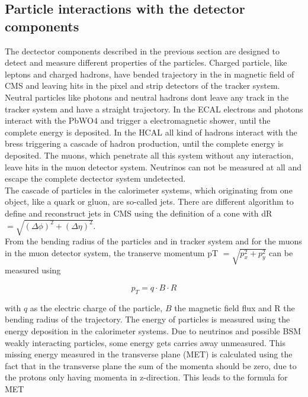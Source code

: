 \subsection{Particle interactions with the detector components}
\label{sec:section_2_2_3}

The dectector components described in the previous section are designed to detect and measure different properties of the particles. Charged particle, like leptons and charged hadrons, have bended trajectory in the in magnetic field of \gls{CMS} and leaving hits in the pixel and strip detectors of the tracker system. Neutral particles like photons and neutral hadrons dont leave any track in the tracker system and have a straight trajectory. In the \gls{ECAL} electrons and photons interact with the \gls{PbWO4} and trigger a electromagnetic shower, until the complete energy is deposited. In the \gls{HCAL} all kind of hadrons interact with the bress triggering a cascade of hadron production, until the complete energy is deposited. The muons, which penetrate all this system without any interaction, leave hits in the muon detector system. Neutrinos can not be measured at all and escape the complete dectector system undetected. \\

The cascade of particles in the calorimeter systems, which originating from one object, like a quark or gluon, are so-called jets. There are different algorithm to define and reconstruct jets in \gls{CMS} using the definition of a cone with \gls{dR} $= \sqrt{(\Delta \phi)^{2} + (\Delta \eta)^{2}}$.\\ 

From the bending radius of the particles and in tracker system and for the muons in the muon detector system, the transerve momentum \gls{pT} $= \sqrt{p_{x}^{2} + p_{y}^{2}}$ can be measured using 

\begin{equation}
	\label{eq:eq_2_5}
	p_{T} = q\cdot B \cdot R
\end{equation} 

with $q$ as the electric charge of the particle, $B$ the magnetic field flux and R the bending radius of the trajectory. The energy of particles is measured using the energy deposition in the calorimeter systems. Due to neutrinos and possible \gls{BSM} weakly interacting particles, some energy gets carries away unmeasured. This missing energy measured in the transverse plane (\gls{MET}) is calculated using the fact that in the transverse plane the sum of the momenta should be zero, due to the protons only having momenta in z-direction. This leads to the formula for \gls{MET}

